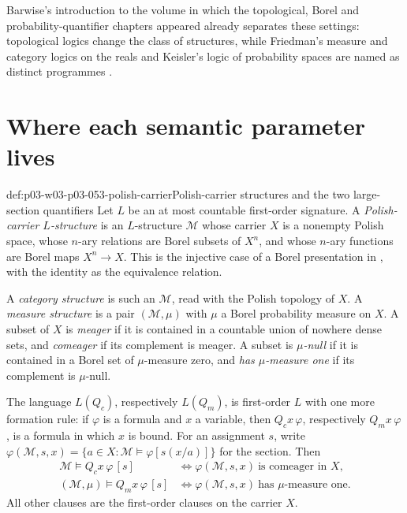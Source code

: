 Barwise's introduction to the volume in which the topological, Borel and
probability-quantifier chapters appeared already separates these
settings: topological logics change the class of structures, while
Friedman's measure and category logics on the reals and Keisler's logic
of probability spaces are named as distinct programmes
\cite[\S2.8, p.~21]{Barwise1985BackgroundAims}.

\section{Where each semantic parameter lives}
\label{sec:p03-w03-p03-053-regimes}

\begin{hbdefinition}{def:p03-w03-p03-053-polish-carrier}{Polish-carrier structures and the two large-section quantifiers}
Let \(L\) be an at most countable first-order signature.
A \emph{Polish-carrier \(L\)-structure} is an \(L\)-structure
\(\mathcal M\) whose carrier \(X\) is a nonempty Polish space, whose
\(n\)-ary relations are Borel subsets of \(X^n\), and whose \(n\)-ary
functions are Borel maps \(X^n\to X\). This is the injective case of a
Borel presentation in \cite[Definition~1.1, p.~1]{MontalbanNiesBorelSurvey},
with the identity as the equivalence relation.

A \emph{category structure} is such an \(\mathcal M\), read with the
Polish topology of \(X\). A \emph{measure structure} is a pair
\((\mathcal M,\mu)\) with \(\mu\) a Borel probability measure on \(X\).
A subset of \(X\) is \emph{meager} if it is contained in a countable
union of nowhere dense sets, and \emph{comeager} if its complement is
meager. A subset is \emph{\(\mu\)-null} if it is contained in a Borel
set of \(\mu\)-measure zero, and \emph{has \(\mu\)-measure one} if its
complement is \(\mu\)-null.

The language \(L(Q_c)\), respectively \(L(Q_m)\), is first-order
\(L\) with one more formation rule: if \(\varphi\) is a formula and
\(x\) a variable, then \(Q_cx\,\varphi\), respectively
\(Q_mx\,\varphi\), is a formula in which \(x\) is bound.
For an assignment \(s\), write
\(\varphi(\mathcal M,s,x)=\{a\in X:\mathcal M\models\varphi[s(x/a)]\}\)
for the section. Then
\[
\begin{aligned}
 \mathcal M\models Q_cx\,\varphi\,[s]
   &\iff \varphi(\mathcal M,s,x)\ \text{is comeager in }X,\\
 (\mathcal M,\mu)\models Q_mx\,\varphi\,[s]
   &\iff \varphi(\mathcal M,s,x)\ \text{has \(\mu\)-measure one}.
\end{aligned}
\]
All other clauses are the first-order clauses on the carrier \(X\).
\end{hbdefinition}

